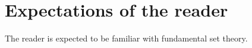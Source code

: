
\section{Expectations of the reader}

The reader is expected to be familiar with fundamental set theory.


